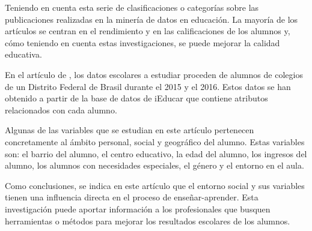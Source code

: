 Teniendo en cuenta esta serie de clasificaciones o categorías sobre las publicaciones realizadas en la minería de datos en educación. La mayoría de los artículos se centran en el rendimiento y en las calificaciones de los alumnos y, cómo teniendo en cuenta estas investigaciones, se puede mejorar la calidad educativa.

En el artículo de , los datos escolares a estudiar proceden de alumnos de colegios de un Distrito Federal de Brasil durante el 2015 y el 2016. Estos datos se han obtenido a partir de la base de datos de iEducar que contiene atributos relacionados con cada alumno. 

Algunas de las variables que se estudian en este artículo pertenecen concretamente al ámbito personal, social y geográfico del alumno. Estas variables son: el barrio del alumno, el centro educativo, la edad del alumno, los ingresos del alumno, los alumnos con necesidades especiales, el género y el entorno en el aula.

Como conclusiones, se indica en este artículo que el entorno social y sus variables tienen una influencia directa en el proceso de enseñar-aprender. Esta investigación puede aportar información a los profesionales que busquen herramientas o métodos para mejorar los resultados escolares de los alumnos.

